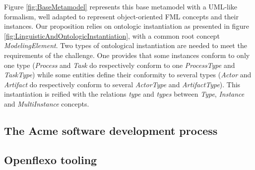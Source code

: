 Figure \ref{fig:BaseMetamodel} represents this base metamodel with a UML-like formalism, well adapted to represent object-oriented FML concepts and their instances. Our proposition relies on ontologic instantiation as presented in figure \ref{fig:LinguisticAndOntologicInstantiation}, with a common root concept \textit{ModelingElement}. Two types of ontological instantiation are needed to meet the requirements of the challenge. One provides that some instances conform to only one type (\textit{Process} and \textit{Task} do respectively conform to one \textit{ProcessType} and \textit{TaskType}) while some entities define their conformity to several types (\textit{Actor} and \textit{Artifact} do respectively conform to several \textit{ActorType} and \textit{ArtifactType}). This instantiation is reified with the relations \textit{type} and \textit{types} between \textit{Type}, \textit{Instance} and \textit{MultiInstance} concepts.  



\subsection{The Acme software development process}

\subsection{Openflexo tooling}



